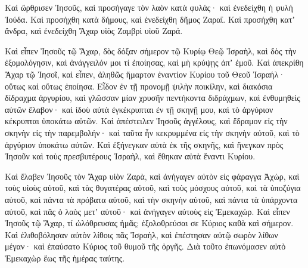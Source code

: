 {\par }{\PP {}Καὶ ὤρθρισεν Ἰησοῦς, καὶ προσήγαγε τὸν λαὸν κατὰ φυλάς· καὶ ἐνεδείχθη ἡ φυλὴ Ἰούδα.
Καὶ προσήχθη κατὰ δήμους, καὶ ἐνεδείχθη δῆμος Ζαραΐ. Καὶ προσήχθη κατʼ ἄνδρα,
καὶ ἐνεδείχθη Ἄχαρ υἱὸς Ζαμβρὶ υἱοῦ Ζαρά.
\par }{\PP {}Καὶ εἶπεν Ἰησοῦς τῷ Ἄχαρ, δὸς δόξαν σήμερον τῷ Κυρίῳ Θεῷ Ἰσραὴλ, καὶ δὸς τὴν ἐξομολόγησιν, καὶ ἀνάγγειλόν μοι τί ἐποίησας, καὶ μὴ κρύψῃς ἀπʼ ἐμοῦ.
Καὶ ἀπεκρίθη Ἄχαρ τῷ Ἰησοῖ, καὶ εἶπεν, ἀληθῶς ἥμαρτον ἐναντίον Κυρίου τοῦ Θεοῦ Ἰσραήλ· οὕτως καὶ οὕτως ἐποίησα.
Εἶδον ἐν τῇ προνομῇ ψιλὴν ποικίλην, καὶ διακόσια δίδραχμα ἀργυρίου, καὶ γλῶσσαν μίαν χρυσῆν πεντήκοντα διδράχμων, καὶ ἐνθυμηθεὶς αὐτῶν ἔλαβον· καὶ ἰδοὺ αὐτὰ ἐγκέκρυπται ἐν τῇ σκηνῇ μου, καὶ τὸ ἀργύριον κέκρυπται ὑποκάτω αὐτῶν.
Καὶ ἀπέστειλεν Ἰησοῦς ἀγγέλους, καὶ ἔδραμον εἰς τὴν σκηνὴν εἰς τὴν παρεμβολήν· καὶ ταῦτα ἦν κεκρυμμένα εἰς τὴν σκηνὴν αὐτοῦ, καὶ τὸ ἀργύριον ὑποκάτω αὐτῶν.
Καὶ ἐξήνεγκαν αὐτὰ ἐκ τῆς σκηνῆς, καὶ ἤνεγκαν πρὸς Ἰησοῦν καὶ τοὺς πρεσβυτέρους Ἰσραὴλ, καὶ ἔθηκαν αὐτὰ ἔναντι Κυρίου.
\par }{\PP {}Καὶ ἔλαβεν Ἰησοῦς τὸν Ἄχαρ υἱὸν Ζαρὰ, καὶ ἀνήγαγεν αὐτὸν εἰς φάραγγα Ἀχὼρ, καὶ τοὺς υἱοὺς αὐτοῦ, καὶ τὰς θυγατέρας αὐτοῦ, καὶ τοὺς μόσχους αὐτοῦ, καὶ τὰ ὑποζύγια αὐτοῦ, καὶ πάντα τὰ πρόβατα αὐτοῦ, καὶ τὴν σκηνὴν αὐτοῦ, καὶ πάντα τὰ ὑπάρχοντα αὐτοῦ, καὶ πᾶς ὁ λαὸς μετʼ αὐτοῦ· καὶ ἀνήγαγεν αὐτοὺς εἰς Ἐμεκαχώρ.
Καὶ εἶπεν Ἰησοῦς τῷ Ἄχαρ, τί ὠλόθρευσας ἡμᾶς; ἐξολοθρεύσαι σε Κύριος καθὰ καὶ σήμερον.
Καὶ ἐλιθοβόλησαν αὐτὸν λίθοις πᾶς Ἰσραὴλ, καὶ ἐπέστησαν αὐτῷ σωρὸν λίθων μέγαν· καὶ ἐπαύσατο Κύριος τοῦ θυμοῦ τῆς ὀργῆς. Διὰ τοῦτο ἐπωνόμασεν αὐτὸ Ἐμεκαχὼρ ἕως τῆς ἡμέρας ταύτης.

}
